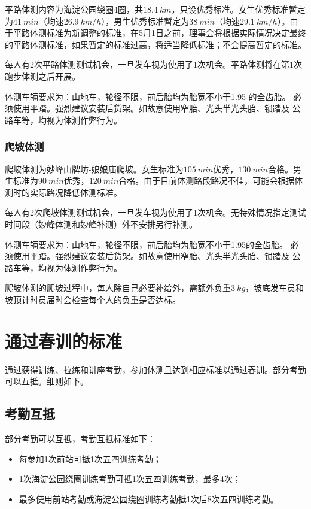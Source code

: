 \documentclass[UTF8]{ctexart}
\begin{document}
平路体测内容为海淀公园绕圈4圈，共$\SI{18.4}{km}$，只设优秀标准。女生优秀标准暂定为$\SI{41}{min}$（均速$\SI{26.9}{km/h}$），男生优秀标准暂定为$\SI{38}{min}$（均速$\SI{29.1}{km/h}$）。由于平路体测标准为新调整的标准，在5月1日之前，理事会将根据实际情况决定最终的平路体测标准，如果暂定的标准过高，将适当降低标准；不会提高暂定的标准。

每人有2次平路体测测试机会，一旦发车视为使用了1次机会。平路体测将在第1次跑步体测之后开展。

体测车辆要求为：山地车，轮径不限，前后胎均为胎宽不小于1.95 的全齿胎。
必须使用平踏。强烈建议安装后货架。如故意使用窄胎、光头半光头胎、锁踏及
公路车等，均视为体测作弊行为。

\subsubsection{爬坡体测}

爬坡体测为妙峰山牌坊-娘娘庙爬坡。女生标准为$\SI{105}{min}$优秀，$\SI{130}{min}$合格。男生标准为$\SI{90}{min}$优秀，$\SI{120}{min}$合格。由于目前体测路段路况不佳，可能会根据体测时的实际路况降低体测标准。

每人有2次爬坡体测测试机会，一旦发车视为使用了1次机会。无特殊情况指定测试时间段（妙峰体测和妙峰补测）外不安排另行补测。

体测车辆要求为：山地车，轮径不限，前后胎均为胎宽不小于1.95的全齿胎。
必须使用平踏。强烈建议安装后货架。如故意使用窄胎、光头半光头胎、锁踏及
公路车等，均视为体测作弊行为。

爬坡体测的爬坡过程中，每人除自己必要补给外，需额外负重$\SI{3}{kg}$，坡底发车员和坡顶计时员届时会检查每个人的负重是否达标。

\section{通过春训的标准}

通过获得训练、拉练和讲座考勤，参加体测且达到相应标准以通过春训。部分考勤可以互抵。细则如下。

\subsection{考勤互抵}

部分考勤可以互抵，考勤互抵标准如下：

\begin{itemize}[nosep,left=4em]
    \item 每参加1次前站可抵1次五四训练考勤；
    \item 1次海淀公园绕圈训练考勤可抵1次五四训练考勤，最多4次；
    \item 最多使用前站考勤或海淀公园绕圈训练考勤抵1次后8次五四训练考勤。 
\end{itemize}
\end{document}
